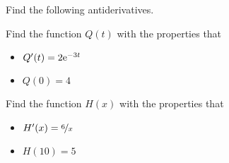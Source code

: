 
Find the following antiderivatives.

\begin{multicols}{2}
 \begin{ProblemSet}[pencil space=3.75in]
 \end{ProblemSet}
\end{multicols}

\begin{ProblemSet}
 \begin{Problem}
  Find the function $Q(t)$ with the properties that
  \begin{itemize}
  \item $Q'(t) = 2 \mathrm{e}^{-3t}$
  \item $Q(0) = 4$
  \end{itemize}
 \end{Problem}
 \begin{Problem}
  Find the function $H(x)$ with the properties that
  \begin{itemize}
  \item $H'(x) = \nicefrac{6}{x}$
  \item $H(10) = 5$
  \end{itemize}
 \end{Problem}
\end{ProblemSet}

